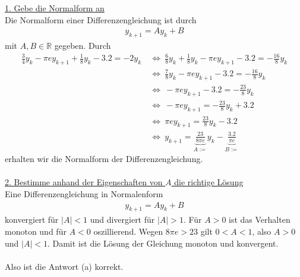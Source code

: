 \underline{1. Gebe die Normalform an}\\
Die Normalform einer Differenzengleichung ist durch
\begin{align*}
y_{k+1} = A y_{k} + B
\end{align*}
mit $ A, B \in \mathbb{R} $ gegeben.
Durch
\begin{align*}
\frac{3}{4} y_k - \pi  e y_{k+1} + \frac{1}{8} y_k -3.2 = -2 y_k 
&\ \Leftrightarrow \
\frac{6}{8} y_k + \frac{1}{8} y_k - \pi  e y_{k+1} -3.2 = -\frac{16}{8} y_k \\
&\ \Leftrightarrow  \
\frac{7}{8} y_k  - \pi  e y_{k+1} -3.2 = -\frac{16}{8} y_k \\
&\ \Leftrightarrow  \
- \pi  e y_{k+1} -3.2 =  -\frac{23}{8} y_k\\
&\ \Leftrightarrow  \
- \pi  e y_{k+1}  =  -\frac{23}{8} y_k + 3.2\\
&\ \Leftrightarrow  \
\pi  e y_{k+1}  =  \frac{23}{8} y_k - 3.2\\
& \ \Leftrightarrow \
 y_{k+1}  =  \underbrace{\frac{23}{8 \pi  e}}_{A :=} y_k - \underbrace{\frac{3.2}{\pi  e}}_{B:=}
\end{align*} 
erhalten wir die Normalform der Differenzengleichung.\\
\\
\underline{2. Bestimme anhand der Eigenschaften von $ A $ die richtige Lösung}\\
Eine Differenzengleichung in Normalenform
\begin{align*}
y_{k+1} = A y_{k} + B
\end{align*}
konvergiert für $ |A| < 1 $ und divergiert für $ |A| > 1 $.
Für $ A> 0 $ ist das Verhalten monoton und für $  A < 0 $ oszillierend.
Wegen $ 8 \pi e > 23 $ gilt $ 0 < A <1  $, also $ A > 0  $ und $ | A |< 1 $.
Damit ist die Lösung der Gleichung monoton und konvergent.\\
\\
Also ist die Antwort (a) korrekt.
\newpage

